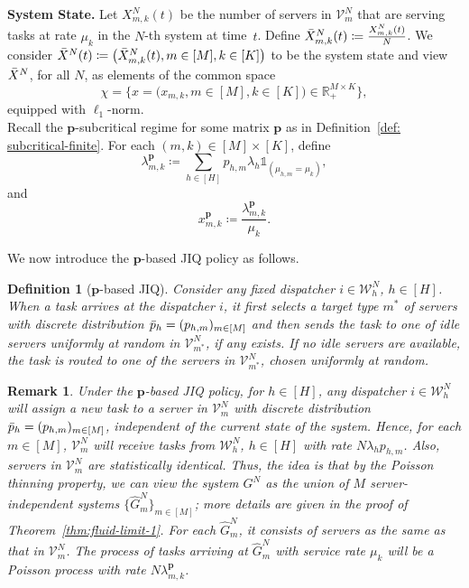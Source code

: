 \documentclass[11pt, reqno]{article}
\newtheorem{remark}[theorem]{Remark}
\newtheorem{defn}[theorem]{Definition}
\numberwithin{equation}{section}
\numberwithin{theorem}{section}
\newcommand{\R}{\mathbb{R}}                 %
\begin{document}
\noindent
\textbf{System State.} 
Let $X^N_{m,k}(t)$ be the number of servers in $\mathcal{V}^N_m$ that are serving tasks at rate $\mu_k$ in the $N$-th system at time~$t$. 
Define $\Bar{X}^N_{m,k}(t)\coloneqq\frac{X^N_{m,k}(t)}{N}$. We consider
$\Bar{X}^N(t)\coloneqq\big(\Bar{X}^N_{m,k}(t),m\in[M],k\in[K]\big)$
to be the system state and view $\Bar{X}^N$, for all $N$, as elements of the common space 
\begin{equation*}
    \chi = \Big\{x=\big(x_{m,k},m\in[M],k\in[K]\big)\in \R_+^{M\times K}\Big\},
\end{equation*}
equipped with $\ell_1$-norm. \\

\noindent
Recall the $\mathbf{p}$-subcritical regime for some matrix $\mathbf{p}$ as in Definition~\ref{def: subcritical-finite}.
For each $(m,k)\in[M]\times[K]$, define 
\begin{equation}\label{eq:lambda-p-mk}
    \lambda^{\mathbf{p}}_{m,k}\coloneqq\sum_{h\in[H]}p_{h,m}\lambda_h\mathds{1}_{(\mu_{h,m}=\mu_k)},
\end{equation}
and \begin{equation}\label{eq:x-p-mk}
    x^{\mathbf{p}}_{m,k}\coloneqq\frac{\lambda^{\mathbf{p}}_{m,k}}{\mu_k}.
\end{equation}

We now introduce the $\mathbf{p}$-based JIQ policy as follows.
\begin{defn}[$\mathbf{p}$-based JIQ]\label{def:p-JIQ}
    Consider any fixed dispatcher $i\in\mathcal{W}^N_h$, $h\in[H]$. When a task arrives at the dispatcher $i$, it first selects a target type $m^*$ of servers with discrete distribution $\Bar{p}_h=(p_{h,m})_{m\in[M]}$ and then sends the task to one of idle servers uniformly at random in $\mathcal{V}^N_{m^*}$, if any exists. 
    If no idle servers are available, the task is routed to one of the servers in $\mathcal{V}^N_{m^*}$, chosen uniformly at random.
\end{defn}
\begin{remark}\label{rem:p-JIQ}
\normalfont
Under the $\mathbf{p}$-based JIQ policy, for $h\in[H]$, any dispatcher $i\in\mathcal{W}^N_h$ will assign a new task to a server in $\mathcal{V}^N_{m}$ with discrete distribution $\Bar{p}_h=(p_{h,m})_{m\in[M]}$, independent of the current state of the system. 
Hence, for each $m\in[M]$, $\mathcal{V}^N_m$ will receive tasks from $\mathcal{W}^N_h$, $h\in[H]$ with rate $N\lambda_hp_{h,m}$. Also, servers in $\mathcal{V}^N_m$ are statistically identical. 
Thus, the idea is that by the Poisson thinning property, we can view the system $G^N$ as the union of $M$ server-independent systems $\{\hat{G}^N_m\}_{m\in[M]}$; more details are given in the proof of Theorem~\ref{thm:fluid-limit-1}. For each $\hat{G}^N_m$, it consists of servers as the same as that in $\mathcal{V}^N_m$. The process of tasks arriving at $\hat{G}^N_m$ with service rate $\mu_k$ will be a Poisson process with rate $N\lambda^{\mathbf{p}}_{m,k}$.
\end{remark}
\end{document}
